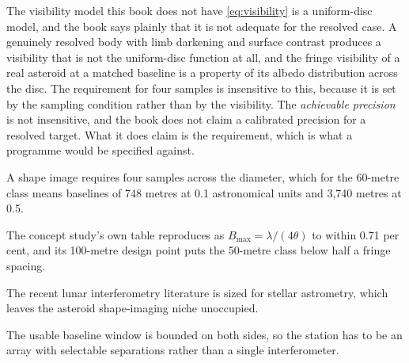\begin{deeper}{The visibility model this book does not have}
\eqref{eq:visibility} is a uniform-disc model, and the book says plainly
that it is not adequate for the resolved case. A genuinely resolved body
with limb darkening and surface contrast produces a visibility that is not
the uniform-disc function at all, and the fringe visibility of a real
asteroid at a matched baseline is a property of its albedo distribution
across the disc. The requirement for four samples is insensitive to this,
because it is set by the sampling condition rather than by the visibility.
The \emph{achievable precision} is not insensitive, and the book does not
claim a calibrated precision for a resolved target. What it does claim is
the requirement, which is what a programme would be specified against.
\end{deeper}

\begin{keytakeaways}
\item A shape image requires four samples across the diameter, which for the
60-metre class means baselines of 748 metres at 0.1 astronomical units and
3,740 metres at 0.5.
\item The concept study's own table reproduces as \(B_{\max} = \lambda/(4
\theta)\) to within 0.71 per cent, and its 100-metre design point puts the
50-metre class below half a fringe spacing.
\item The recent lunar interferometry literature is sized for stellar
astrometry, which leaves the asteroid shape-imaging niche unoccupied.
\item The usable baseline window is bounded on both sides, so the station has
to be an array with selectable separations rather than a single
interferometer.
\end{keytakeaways}
